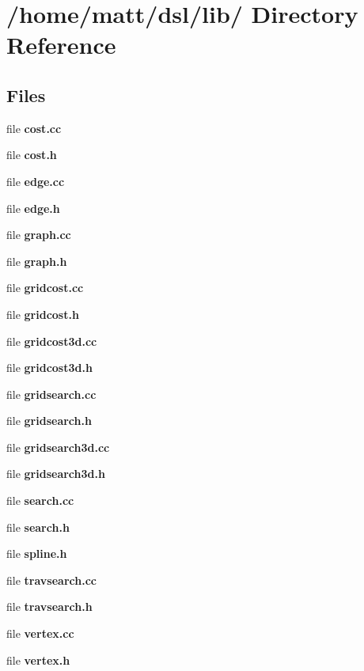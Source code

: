 \section{/home/matt/dsl/lib/ \-Directory \-Reference}
\label{dir_9505832e787e60e1ddde1555e3d4dc98}
\subsection*{\-Files}
\begin{DoxyCompactItemize}
\item 
file {\bf cost.\-cc}
\item 
file {\bf cost.\-h}
\item 
file {\bf edge.\-cc}
\item 
file {\bf edge.\-h}
\item 
file {\bf graph.\-cc}
\item 
file {\bf graph.\-h}
\item 
file {\bf gridcost.\-cc}
\item 
file {\bf gridcost.\-h}
\item 
file {\bf gridcost3d.\-cc}
\item 
file {\bf gridcost3d.\-h}
\item 
file {\bf gridsearch.\-cc}
\item 
file {\bf gridsearch.\-h}
\item 
file {\bf gridsearch3d.\-cc}
\item 
file {\bf gridsearch3d.\-h}
\item 
file {\bf search.\-cc}
\item 
file {\bf search.\-h}
\item 
file {\bf spline.\-h}
\item 
file {\bf travsearch.\-cc}
\item 
file {\bf travsearch.\-h}
\item 
file {\bf vertex.\-cc}
\item 
file {\bf vertex.\-h}
\end{DoxyCompactItemize}
